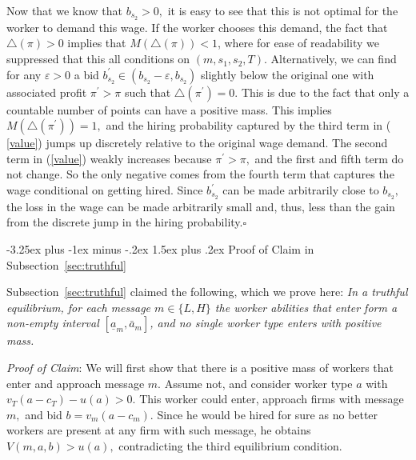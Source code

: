 \documentclass[12pt]{article}
\makeatletter
\renewcommand{\subsection}{%
  \@startsection{subsection}{2}{\z@}%
  {-3.25ex plus -1ex minus -.2ex}%
  {1.5ex plus .2ex}%
  {\normalfont\large\bfseries}%
}
\makeatother
\begin{document}
Now that we know that $b_{s_{2}}>0,$ it is easy to see that this is not
optimal for the worker to demand this wage. If the worker chooses this
demand, the fact that $\bigtriangleup (\pi )>0$ implies that $%
M(\bigtriangleup (\pi ))<1$, where for ease of readability we suppressed
that this all conditions on $(m,s_{1},s_{2},T).$ Alternatively, we can find
for any $\varepsilon >0$ a bid $b_{s_{2}}^{\prime }\in
(b_{s_{2}}-\varepsilon ,b_{s_{2}})$ slightly below the original one with
associated profit $\pi ^{\prime }>\pi $ such that $\bigtriangleup (\pi
^{\prime })=0.$ This is due to the fact that only a countable number of
points can have a positive mass. This implies $M(\bigtriangleup (\pi
^{\prime }))=1,$ and the hiring probability captured by the third term in (%
\ref{value}) jumps up discretely relative to the original wage demand$.$ The
second term in (\ref{value}) weakly increases because $\pi ^{\prime }>\pi ,$
and the first and fifth term do not change. So the only negative comes from
the fourth term that captures the wage conditional on getting hired. Since $%
b_{s_{2}}^{\prime }$ can be made arbitrarily close to $b_{s_{2}},$ the loss
in the wage can be made arbitrarily small and, thus, less than the gain from
the discrete jump in the hiring probability.$\square $



\subsection{Proof of Claim in Subsection~\ref{sec:truthful}}\label{online_app:proof_claim}

Subsection~\ref{sec:truthful} claimed the following, which we prove here: \textit{In a truthful equilibrium, for each message $m\in\{L,H\}$ the worker abilities that enter form a non-empty interval $[\underline{a}_{m},\bar{a}_{m}]$, and no single worker type enters with positive mass.}

\bigskip

\textit{Proof of Claim}: We will first show that there is a positive mass of workers that
enter and approach message $m.$ Assume not, and consider worker type $a$
with $v_{T}(a-c_{T})-u\left( a\right) >0.$ This worker could enter, approach
firms with message $m,$ and bid $b=v_{m}(a-c_{m}).$ Since he would be hired
for sure as no better workers are present at any firm with such message, he
obtains $V(m,a,b)>u(a),$ contradicting the third equilibrium condition.
\end{document}
